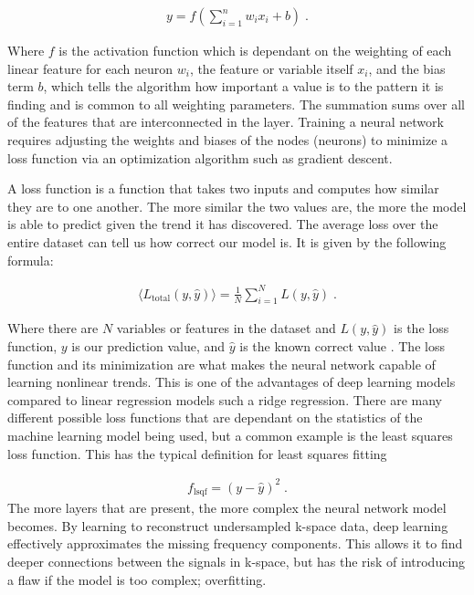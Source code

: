 \documentclass[14pt]{extreport}
\begin{document}
        \begin{align}
           y = f\left(\sum_{i = 1}^n w_i x_i + b \right) \;.
        \end{align}

        Where $f$ is the activation function which is dependant on the weighting of each linear feature for each neuron $w_i$, the feature or variable itself $x_i$, and the bias term $b$, which tells the algorithm how important a value is to the pattern it is finding and is common to all weighting parameters. The summation sums over all of the features that are interconnected in the layer. Training a neural network requires adjusting the weights and biases of the nodes (neurons) to minimize a loss function via an optimization algorithm such as gradient descent. 
        
        A loss function is a function that takes two inputs and computes how similar they are to one another. The more similar the two values are, the more the model is able to predict given the trend it has discovered. The average loss over the entire dataset can tell us how correct our model is. It is given by the following formula:
        
        \begin{align}
            \langle L_{\text{total}}(y, \hat{y}) \rangle = \frac{1}{N} \sum_{i = 1}^N L(y, \hat{y})\;.
        \end{align}

        Where there are $N$ variables or features in the dataset and $L(y, \hat{y})$ is the loss function, $y$ is our prediction value, and $\hat{y}$ is the known correct value \cite{Hoyle_2024}. The loss function and its minimization are what makes the neural network capable of learning nonlinear trends. This is one of the advantages of deep learning models compared to linear regression models such a ridge regression. There are many different possible loss functions that are dependant on the statistics of the machine learning model being used, but a common example is the least squares loss function. This has the typical definition for least squares fitting \cite{Hoyle_2024}
        
        \begin{align}
            f_{\text{lsqf}} = \left(y - \hat{y} \right)^2\;.
        \end{align}
        The more layers that are present, the more complex the neural network model becomes. By learning to reconstruct undersampled k-space data, deep learning effectively approximates the missing frequency components. This allows it to find deeper connections between the signals in k-space, but has the risk of introducing a flaw if the model is too complex; overfitting. 
\end{document}
